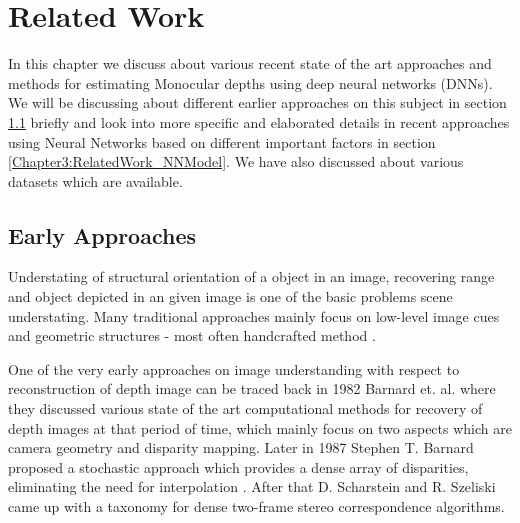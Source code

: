 
\chapter{Related Work} %

\label{Chapter3:RelatedWork} %

In this chapter we discuss about various recent state of the art approaches and methods for estimating Monocular depths using deep neural networks (DNNs). We will be discussing about different earlier approaches on this subject in section \ref{Chapter3:RelatedWork_EarlyApproach} briefly and look into more specific and elaborated details in recent approaches using Neural Networks based on different important factors in section \ref{Chapter3:RelatedWork_NNModel}. We have also discussed about various datasets which are available. 

\section{Early Approaches}
\label{Chapter3:RelatedWork_EarlyApproach}
Understating of structural orientation of a object in an image, recovering range and object depicted in an given image is one of the basic problems scene understating. Many traditional approaches mainly focus on low-level image cues and geometric structures - most often handcrafted method \cite{torralba2002depth, pentland1987new,lai1992generalized,saxena2006learning}.
 
One of the very early approaches on image understanding with respect to reconstruction of depth image can be traced back in 1982 Barnard et. al. \cite{barnard1982computational} where they discussed various state of the art  computational methods for recovery of depth images at that period of time, which mainly focus on two aspects which are camera geometry and disparity mapping. Later in 1987 Stephen T. Barnard proposed a stochastic approach which provides a dense array of disparities, eliminating the need for interpolation \cite{barnard1987stochastic}. After that D. Scharstein and R. Szeliski \cite{scharstein2002taxonomy} came up with a taxonomy for dense two-frame stereo correspondence algorithms.\\

